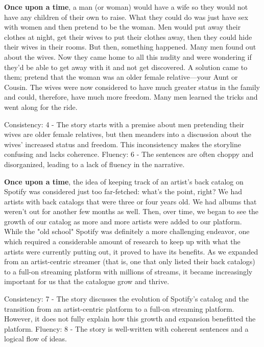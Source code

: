\documentclass{article}
\begin{document}
\textbf{Once upon a time}, a man (or woman) would have a wife so they would not have any children of their own to raise. What they could do was just have sex with women and then pretend to be the woman. Men would put away their clothes at night, get their wives to put their clothes away, then they could hide their wives in their rooms. But then, something happened. Many men found out about the wives. Now they came home to all this nudity and were wondering if they'd be able to get away with it and not get discovered. A solution came to them; pretend that the woman was an older female relative—your Aunt or Cousin. The wives were now considered to have much greater status in the family and could, therefore, have much more freedom. Many men learned the tricks and went along for the ride.

Consistency: 4 - The story starts with a premise about men pretending their wives are older female relatives, but then meanders into a discussion about the wives' increased status and freedom. This inconsistency makes the storyline confusing and lacks coherence.
Fluency: 6 - The sentences are often choppy and disorganized, leading to a lack of fluency in the narrative.

\textbf{Once upon a time}, the idea of keeping track of an artist's back catalog on Spotify was considered just too far-fetched: what's the point, right? We had artists with back catalogs that were three or four years old. We had albums that weren't out for another few months as well. Then, over time, we began to see the growth of our catalog as more and more artists were added to our platform. While the "old school" Spotify was definitely a more challenging endeavor, one which required a considerable amount of research to keep up with what the artists were currently putting out, it proved to have its benefits. As we expanded from an artist-centric streamer (that is, one that only listed their back catalogs) to a full-on streaming platform with millions of streams, it became increasingly important for us that the catalogue grow and thrive.

Consistency: 7 - The story discusses the evolution of Spotify's catalog and the transition from an artist-centric platform to a full-on streaming platform. However, it does not fully explain how this growth and expansion benefitted the platform.
Fluency: 8 - The story is well-written with coherent sentences and a logical flow of ideas.
\end{document}
